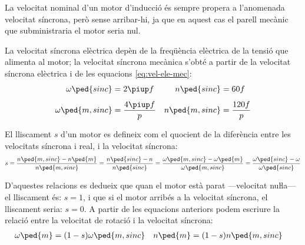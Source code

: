 La velocitat nominal d'un motor d'inducció és sempre propera a l'anomenada velocitat síncrona, però sense arribar-hi, ja que en aquest cas el parell mecànic que subministraria el motor seria nul.

La velocitat síncrona elèctrica depèn de la freqüència elèctrica de la tensió que alimenta al motor; la velocitat síncrona mecànica s'obté a partir de la velocitat síncrona elèctrica i de  les equacions \eqref{eq:vel-ele-mec}:
\begin{subequations}\index{motors d'inducció!velocitat síncrona}
\begin{align}
    \omega\ped{sinc} &= 2 \piup f & n\ped{sinc} &= 60 f \\[1ex]
    \omega\ped{m,sinc} &= \frac{4 \piup f}{p} & n\ped{m,sinc} &= \frac{120 f}{p}\label{eq:vel-mec-sinc}
\end{align}
\end{subequations}

El lliscament $s$ d'un motor es defineix com el quocient de la diferència entre les velocitats síncrona  i real, i la velocitat síncrona:
\begin{equation}\label{eq:lliscament}\index{lliscament}
    s = \frac{n\ped{m,sinc}-n\ped{m}}{n\ped{m,sinc}} =
    \frac{n\ped{sinc}-n}{n\ped{sinc}} =
    \frac{\omega\ped{m,sinc}-\omega\ped{m}}{\omega\ped{m,sinc}} =
    \frac{\omega\ped{sinc}-\omega}{\omega\ped{sinc}}
\end{equation}

D'aquestes relacions es dedueix que quan el motor està parat ---velocitat nuŀla--- el lliscament és: $s=1$, i que si el motor arribés a la velocitat síncrona, el lliscament seria: $s=0$. A partir de les equacions anteriors podem escriure la relació entre la velocitat de rotació i la velocitat síncrona:
\begin{align}
    \omega\ped{m} &= (1-s) \omega\ped{m,sinc} & n\ped{m} &= (1-s) n\ped{m,sinc} \label{eq:wm-wsinc}
\end{align}



